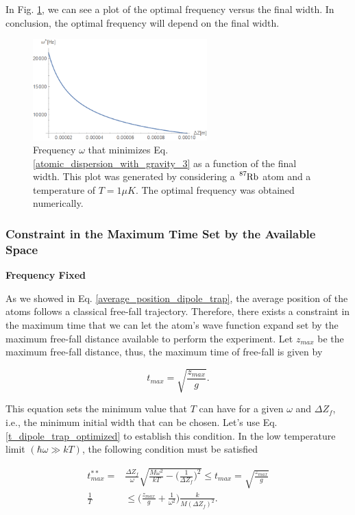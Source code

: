 \documentclass{article}
\begin{document}
In Fig. \ref{fig:optimal_frequency_vs_final_width}, we can see a plot of the optimal frequency versus the final width. In conclusion, the optimal frequency will depend on the final width.

\begin{figure}
\centering
\includegraphics[width=0.6\textwidth]{optimal_frequency_vs_final_width.png}
\caption{\label{fig:optimal_frequency_vs_final_width}Frequency $\omega$ that minimizes Eq. \ref{atomic_dispersion_with_gravity_3} as a function of the final width. This plot was generated by considering a $\ce{^{87}_{}Rb}$ atom and a temperature of $T=1\mu K$. The optimal frequency was obtained numerically.}
\end{figure}

\subsubsection{Constraint in the Maximum Time Set by the Available Space}
\textbf{Frequency Fixed}

As we showed in Eq. \ref{average_position_dipole_trap}, the average position of the atoms follows a classical free-fall trajectory. Therefore, there exists a constraint in the maximum time that we can let the atom's wave function expand set by the maximum free-fall distance available to perform the experiment. Let $z_{max}$ be the maximum free-fall distance, thus, the maximum time of free-fall is given by

\begin{equation}
    t_{max} = \sqrt{\frac{z_{max}}{g}}.
\end{equation}

This equation sets the minimum value that $T$ can have for a given $\omega$ and $\Delta Z_{f}$, i.e., the minimum initial width that can be chosen. Let's use Eq. \ref{t_dipole_trap_optimized} to establish this condition. In the low temperature limit $(\hbar \omega \gg kT)$, the following condition must be satisfied

\begin{equation}\label{dipole_trap_temperature_length_condition}
\begin{split}
    t^{**}_{max} = & \frac{\Delta Z_{f}}{\omega} \sqrt{\frac{M \omega^{2}}{kT} - \bigg(\frac{1}{\Delta Z_{f}}\bigg)^{2}} \le t_{max} = \sqrt{\frac{z_{max}}{g}} \\
    \frac{1}{T} & \le \bigg( \frac{z_{max}}{g} + \frac{1}{\omega^{2}} \bigg) \frac{k}{M (\Delta Z_{f})^{2}}.
\end{split}
\end{equation}
\end{document}
